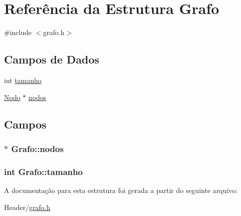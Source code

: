 \hypertarget{structGrafo}{
\section{Referência da Estrutura Grafo}
\label{structGrafo}
}


{\ttfamily \#include $<$grafo.h$>$}

\subsection*{Campos de Dados}
\begin{DoxyCompactItemize}
\item 
int \hyperlink{structGrafo_abad6c5aedf98a0d0f7c2aa402193d737}{tamanho}
\item 
\hyperlink{structnodo}{Nodo} $\ast$ \hyperlink{structGrafo_a2c687beb3adc4b03f10265637d58812e}{nodos}
\end{DoxyCompactItemize}


\subsection{Campos}
\hypertarget{structGrafo_a2c687beb3adc4b03f10265637d58812e}{
\subsubsection[{nodos}]{$\ast$ {\bf Grafo::nodos}}}
\label{structGrafo_a2c687beb3adc4b03f10265637d58812e}
\hypertarget{structGrafo_abad6c5aedf98a0d0f7c2aa402193d737}{
\subsubsection[{tamanho}]{\setlength{\rightskip}{0pt plus 5cm}int {\bf Grafo::tamanho}}}
\label{structGrafo_abad6c5aedf98a0d0f7c2aa402193d737}


A documentação para esta estrutura foi gerada a partir do seguinte arquivo:\begin{DoxyCompactItemize}
\item 
Header/\hyperlink{grafo_8h}{grafo.h}\end{DoxyCompactItemize}
